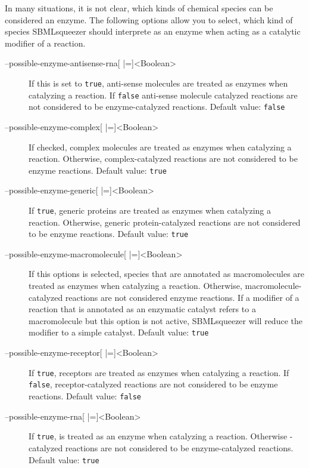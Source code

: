 In many situations, it is not clear, which kinds of chemical species can be
considered an enzyme. The following options allow you to select, which kind
of species SBMLsqueezer should interprete as an enzyme when acting as a
catalytic modifier of a reaction.
\begin{description}
\item[--possible-enzyme-antisense-rna{[} |={]}<Boolean>]
  If this is set to \texttt{true}, anti-sense \RNA molecules are treated as enzymes when
  catalyzing a reaction. If \texttt{false} anti-sense \RNA molecule
  catalyzed reactions are not considered to be enzyme-catalyzed
  reactions.
  Default value: \texttt{false}

\item[--possible-enzyme-complex{[} |={]}<Boolean>]
  If checked, complex molecules are treated as enzymes
  when catalyzing a reaction. Otherwise, complex-catalyzed reactions
  are not considered to be enzyme reactions.
  Default value: \texttt{true}

\item[--possible-enzyme-generic{[} |={]}<Boolean>]
  If \texttt{true}, generic proteins are treated as enzymes when
  catalyzing a reaction. Otherwise, generic protein-catalyzed
  reactions are not considered to be enzyme reactions.
  Default value: \texttt{true}

\item[--possible-enzyme-macromolecule{[} |={]}<Boolean>]
  If this options is selected, species that are annotated as macromolecules
  are treated as enzymes when catalyzing a reaction. Otherwise,
  macromolecule-catalyzed reactions are not considered enzyme
  reactions. If a modifier of a reaction that is annotated as
  an enzymatic catalyst refers to a macromolecule but this option
  is not active, SBMLsqueezer will reduce the modifier to a simple
  catalyst.
  Default value: \texttt{true}

\item[--possible-enzyme-receptor{[} |={]}<Boolean>]
  If \texttt{true}, receptors are treated as enzymes when catalyzing a reaction.
  If \texttt{false}, receptor-catalyzed reactions are not considered
  to be enzyme reactions.
  Default value: \texttt{false}

\item[--possible-enzyme-rna{[} |={]}<Boolean>]
  If \texttt{true}, \RNA is treated as an enzyme when catalyzing
  a reaction. Otherwise \RNA-catalyzed reactions are not considered
  to be enzyme-catalyzed reactions.
  Default value: \texttt{true}


\end{description}
